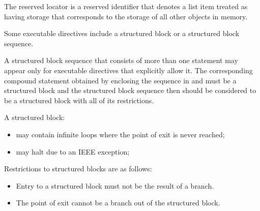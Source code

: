 The reserved locator  is a reserved identifier that
denotes a list item treated as having storage that corresponds to the storage
of all other objects in memory.

Some executable directives include a structured block or a structured block
sequence.

\begin{ccppspecific}
A structured block sequence that consists of more than one statement may
appear only for executable directives that explicitly allow it.  The
corresponding compound statement obtained by enclosing the sequence in
\tcode{\{} and \tcode{\}} must be a structured block and the structured
block sequence then should be considered to be a structured block with all
of its restrictions.
\end{ccppspecific}

A structured block:

\begin{itemize}
\item may contain infinite loops where the point of exit is never reached; 
\item may halt due to an IEEE exception;


\end{itemize}

\restrictions
Restrictions to structured blocks are as follows:

\begin{itemize}
\item Entry to a structured block must not be the result of a branch.
\item The point of exit cannot be a branch out of the structured block.

\end{itemize}

